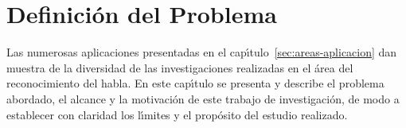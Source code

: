 \chapter{Definici\'on del Problema}
\label{sec:problema}
 
Las numerosas aplicaciones presentadas en el cap{\'\i}tulo~\ref{sec:areas-aplicacion} dan muestra de la 
diversidad de las investigaciones realizadas en el \'area del reconocimiento del habla. 
En este cap{\'\i}tulo se presenta y describe el problema abordado, el alcance y la motivaci\'on de
este trabajo de investigaci\'on, de modo a establecer con claridad los l{\'\i}mites
y el prop\'osito del estudio realizado.




